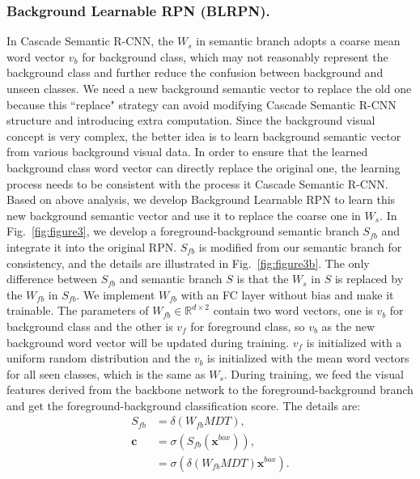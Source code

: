 \documentclass[runningheads]{llncs}
\begin{document}
\subsubsection{Background Learnable RPN (BLRPN). \label{BLRPN}}
In Cascade Semantic R-CNN, the $W_{s}$ in semantic branch adopts a coarse mean word vector $v_b$ for background class, which may not reasonably represent the background class and further reduce the confusion between background and unseen classes. We need a new background semantic vector to replace the old one because this ``replace" strategy can avoid modifying Cascade Semantic R-CNN structure and introducing extra computation. Since the background visual concept is very complex, the better idea is to learn background semantic vector from various background visual data. In order to ensure that the learned background class word vector can directly replace the original one, the learning process needs to be consistent with the process it Cascade Semantic R-CNN.
Based on above analysis, we develop Background Learnable RPN to learn this new background semantic vector and use it to replace the coarse one in $W_{s}$. In Fig.~\ref{fig:figure3}, we develop a foreground-background semantic branch ${S}_{fb}$ and integrate it into the original RPN. ${S}_{fb}$ is modified from our semantic branch for consistency, and the details are illustrated in Fig.~\ref{fig:figure3b}. The only difference between ${S}_{fb}$ and semantic branch ${S}$ is that the $W_s$ in ${S}$ is replaced by the $W_{fb}$ in ${S}_{fb}$. We implement $W_{fb}$ with an FC layer without bias and make it trainable. The parameters of $W_{fb} \in \mathbb{R}^{d \times 2}$ contain two word vectors, one is $v_b$ for background class and the other is $v_f$ for foreground class, so $v_b$ as the new background word vector will be updated during training. $v_f$ is initialized with a uniform random distribution and the $v_b$ is initialized with the mean word vectors for all seen classes, which is the same as $W_{s}$. During training, we feed the visual features derived from the backbone network to the foreground-background branch and get the foreground-background classification score. The details are:
\begin{equation}
\begin{split}
    S_{fb} &= \delta(W_{fb}MDT), \\
    \mathbf{c} &= \sigma(S_{fb}(\mathbf{x}^{box})), \\
               &= \sigma(\delta(W_{fb}MDT)\mathbf{x}^{box}). 
\end{split}
\label{con:blrpn}
\end{equation}
\end{document}
